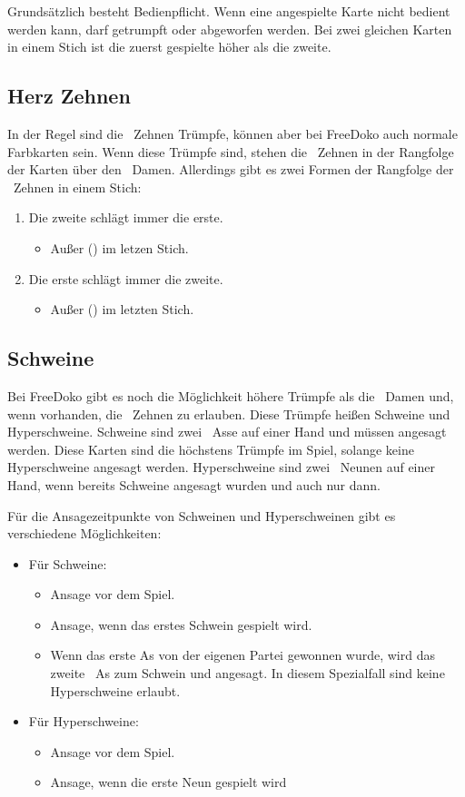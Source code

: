 \documentclass{scrartcl}
\begin{document}
Grundsätzlich besteht Bedienpflicht. Wenn eine angespielte Karte nicht bedient werden kann, darf getrumpft oder abgeworfen werden.  Bei zwei gleichen Karten in einem Stich ist die zuerst gespielte höher als die zweite.

\subsection{Herz Zehnen}
In der Regel sind die \Herz\ Zehnen Trümpfe, können aber \optional bei FreeDoko auch normale Farbkarten sein. Wenn diese Trümpfe sind, stehen die \Herz\ Zehnen in der Rangfolge der Karten über den \Kreuz\ Damen. Allerdings gibt es \optional zwei Formen der Rangfolge der \Herz\ Zehnen in einem Stich:
\begin{enumerate}
  \item Die zweite schlägt immer die erste.
    \begin{itemize}
      \item Außer (\optional) im letzen Stich.
    \end{itemize}
  \item Die erste schlägt immer die zweite.
    \begin{itemize}
      \item Außer (\optional) im letzten Stich.
    \end{itemize}
\end{enumerate}

\subsection{Schweine}
Bei FreeDoko gibt es \optional noch die Möglichkeit höhere Trümpfe als die \Kreuz\ Damen und, wenn vorhanden, die \Herz\ Zehnen zu erlauben. Diese Trümpfe heißen Schweine und Hyperschweine. Schweine sind zwei \Karo\ Asse auf einer Hand und müssen angesagt werden. Diese Karten sind die höchstens Trümpfe im Spiel, solange keine Hyperschweine angesagt werden. Hyperschweine sind zwei \Karo\ Neunen auf einer Hand, wenn bereits Schweine angesagt wurden und auch nur dann.

Für die Ansagezeitpunkte von Schweinen und Hyperschweinen gibt es \optional verschiedene Möglichkeiten:
\begin{itemize}
  \item Für Schweine:
    \begin{itemize}
      \item Ansage vor dem Spiel.
      \item Ansage, wenn das erstes Schwein gespielt wird.
      \item Wenn das erste As von der eigenen Partei gewonnen wurde, wird das
	zweite \Karo\ As zum Schwein und angesagt.
	In diesem Spezialfall sind keine Hyperschweine erlaubt.
    \end{itemize}
  \item Für Hyperschweine:
    \begin{itemize}
      \item Ansage vor dem Spiel.
      \item Ansage, wenn die erste Neun gespielt wird
    \end{itemize}
\end{itemize}
\end{document}

